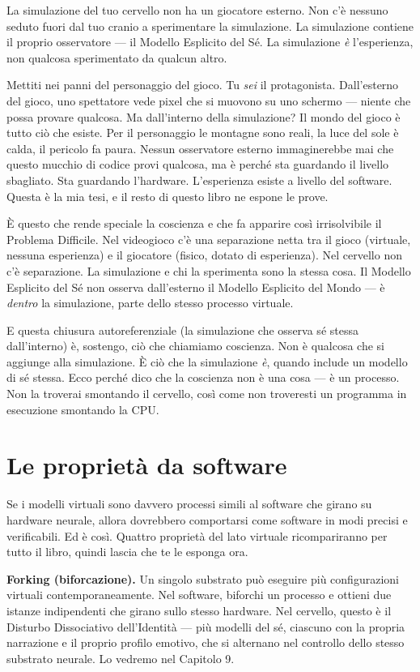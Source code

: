 \documentclass[11pt, twoside, openright]{book}
\begin{document}
La simulazione del tuo cervello non ha un giocatore esterno. Non c'è nessuno seduto fuori dal tuo cranio a sperimentare la simulazione. La simulazione contiene il proprio osservatore --- il Modello Esplicito del Sé. La simulazione \textit{è} l'esperienza, non qualcosa sperimentato da qualcun altro.

Mettiti nei panni del personaggio del gioco. Tu \textit{sei} il protagonista. Dall'esterno del gioco, uno spettatore vede pixel che si muovono su uno schermo --- niente che possa provare qualcosa. Ma dall'interno della simulazione? Il mondo del gioco è tutto ciò che esiste. Per il personaggio le montagne sono reali, la luce del sole è calda, il pericolo fa paura. Nessun osservatore esterno immaginerebbe mai che questo mucchio di codice provi qualcosa, ma è perché sta guardando il livello sbagliato. Sta guardando l'hardware. L'esperienza esiste a livello del software. Questa è la mia tesi, e il resto di questo libro ne espone le prove.

È questo che rende speciale la coscienza e che fa apparire così irrisolvibile il Problema Difficile. Nel videogioco c'è una separazione netta tra il gioco (virtuale, nessuna esperienza) e il giocatore (fisico, dotato di esperienza). Nel cervello non c'è separazione. La simulazione e chi la sperimenta sono la stessa cosa. Il Modello Esplicito del Sé non osserva dall'esterno il Modello Esplicito del Mondo --- è \textit{dentro} la simulazione, parte dello stesso processo virtuale.

E questa chiusura autoreferenziale (la simulazione che osserva sé stessa dall'interno) è, sostengo, ciò che chiamiamo coscienza. Non è qualcosa che si aggiunge alla simulazione. È ciò che la simulazione \textit{è}, quando include un modello di sé stessa. Ecco perché dico che la coscienza non è una cosa --- è un processo. Non la troverai smontando il cervello, così come non troveresti un programma in esecuzione smontando la CPU.

\section*{Le proprietà da software}

Se i modelli virtuali sono davvero processi simili al software che girano su hardware neurale, allora dovrebbero comportarsi come software in modi precisi e verificabili. Ed è così. Quattro proprietà del lato virtuale ricompariranno per tutto il libro, quindi lascia che te le esponga ora.

\textbf{Forking (biforcazione).} Un singolo substrato può eseguire più configurazioni virtuali contemporaneamente. Nel software, biforchi un processo e ottieni due istanze indipendenti che girano sullo stesso hardware. Nel cervello, questo è il Disturbo Dissociativo dell'Identità --- più modelli del sé, ciascuno con la propria narrazione e il proprio profilo emotivo, che si alternano nel controllo dello stesso substrato neurale. Lo vedremo nel Capitolo 9.
\end{document}
